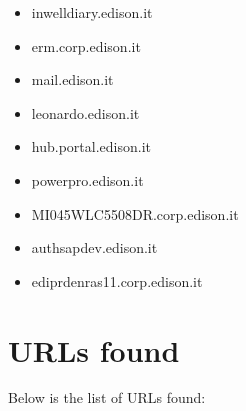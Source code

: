 \documentclass{article}
\begin{document}
\begin{itemize}
        \item inwelldiary.edison.it
    
        \item erm.corp.edison.it
    
        \item mail.edison.it
    
        \item leonardo.edison.it
    
        \item hub.portal.edison.it
    
        \item powerpro.edison.it
    
        \item MI045WLC5508DR.corp.edison.it
    
        \item authsapdev.edison.it
    
        \item ediprdenras11.corp.edison.it
    
\end{itemize}



\section*{URLs found}

Below is the list of URLs found:
\end{document}
